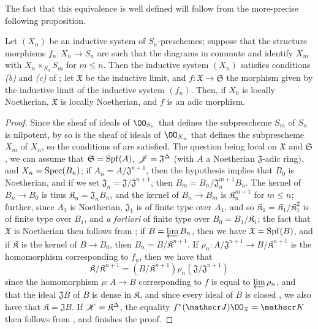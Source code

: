 The fact that this equivalence is well defined will follow from the more-precise following proposition.

\begin{prop}[10.12.3.1]
\label{1.10.12.3.1}
Let $(X_n)$ be an inductive system of $S_n$-preschemes;
suppose that the structure morphisms $f_n:X_n\to S_n$ are such that the diagrams in  commute and identify $X_m$ with $X_n\times_{S_n}S_m$ for $m\leq n$.
Then the inductive system $(X_n)$ satisfies conditions \emph{(b)} and \emph{(c)} of ;
let $\mathfrak{X}$ be the inductive limit, and $f:\mathfrak{X}\to\mathfrak{S}$ the morphism given by the inductive limit of the inductive system $(f_n)$.
Then, if $X_0$ is locally Noetherian, $\mathfrak{X}$ is locally Noetherian, and $f$ is an adic morphism.
\end{prop}

\begin{proof}
\label{proof-1.10.12.3.1}
Since the sheaf of ideals of $\OO_{S_n}$ that defines the subprescheme $S_m$ of $S_n$ is nilpotent, by  so is the sheaf of ideals of $\OO_{X_n}$ that defines the subprescheme $X_m$ of $X_n$, so the conditions of  are satisfied.
The question being local on $\mathfrak{X}$ and $\mathfrak{S}$, we can assume that $\mathfrak{S}=\operatorname{Spf}(A)$, $\mathscr{J}=\mathfrak{J}^\Delta$ (with $A$ a Noetherian $\mathfrak{J}$-adic ring), and $X_n=\operatorname{Spec}(B_n)$;
if $A_n=A/\mathfrak{J}^{n+1}$, then the hypothesis implies that $B_0$ is Noetherian, and if we set $\mathfrak{J}_n=\mathfrak{J}/\mathfrak{J}^{n+1}$, then $B_m=B_n/\mathfrak{J}_n^{m+1}B_n$.
The kernel of $B_n\to B_0$ is thus $\mathfrak{K}_n=\mathfrak{J}_nB_n$, and the kernel of $B_n\to B_m$ is $\mathfrak{K}_n^{m+1}$ for $m\leq n$;
further, since $A_1$ is Noetherian, $\mathfrak{J}_1$ is of finite type over $A_1$, and so $\mathfrak{K}_1=\mathfrak{K}_1/\mathfrak{K}_1^2$ is of finite type over $B_1$, and \emph{a fortiori} of finite type over $B_0=B_1/\mathfrak{K}_1$;
the fact that $\mathfrak{X}$ is Noetherian then follows from ;
if $B=\varprojlim B_n$, then we have $\mathfrak{X}=\operatorname{Spf}(B)$, and if $\mathfrak{K}$ is the kernel of $B\to B_0$, then $B_n=B/\mathfrak{K}^{n+1}$.
If $\rho_n:A/\mathfrak{J}^{n+1}\to B/\mathfrak{K}^{n+1}$ is the homomorphism corresponding to $f_n$, then we have that
\[
    \mathfrak{K}/\mathfrak{K}^{n+1} = (B/\mathfrak{K}^{n+1})\rho_n(\mathfrak{J}/\mathfrak{J}^{n+1})
\]
since the homomorphism $\rho:A\to B$ corresponding to $f$ is equal to $\varprojlim\rho_n$, and that the ideal $\mathfrak{J}B$ of $B$ is dense in $\mathfrak{K}$, and since every ideal of $B$ is closed , we also have that $\mathfrak{K}=\mathfrak{J}B$.
If $\mathscr{K}=\mathfrak{K}^\Delta$, the equality $f^*(\sh{J})\OO_\mathfrak{X}=\sh{K}$ then follows from , and finishes the proof.
\end{proof}

